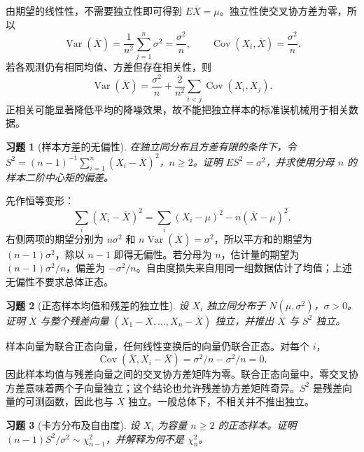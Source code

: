\documentclass[UTF8,12pt,a4paper,fontset=fandol]{ctexart}
\newtheorem{exercise}{习题}[section]
\begin{document}
\begin{solve}\label{a:B8.1}由期望的线性性，不需要独立性即可得到 $E\overline X=\mu$。独立性使交叉协方差为零，所以\[\operatorname{Var}(\overline X)=\frac{1}{n^2}\sum_{j=1}^n\sigma^2=\frac{\sigma^2}{n},\qquad\operatorname{Cov}(X_i,\overline X)=\frac{\sigma^2}{n}.\]若各观测仍有相同均值、方差但存在相关性，则\[\operatorname{Var}(\overline X)=\frac{\sigma^2}{n}+\frac{2}{n^2}\sum_{i<j}\operatorname{Cov}(X_i,X_j).\]正相关可能显著降低平均的降噪效果，故不能把独立样本的标准误机械用于相关数据。\end{solve}

\begin{exercise}[样本方差的无偏性]\label{q:B8.2}
在独立同分布且方差有限的条件下，令 $S^2=(n-1)^{-1}\sum_{i=1}^n(X_i-\overline X)^2$，$n\ge2$。证明 $ES^2=\sigma^2$，并求使用分母 $n$ 的样本二阶中心矩的偏差。\par{}
\end{exercise}

\begin{solve}\label{a:B8.2}先作恒等变形：\[\sum_i(X_i-\overline X)^2=\sum_i(X_i-\mu)^2-n(\overline X-\mu)^2.\]右侧两项的期望分别为 $n\sigma^2$ 和 $n\operatorname{Var}(\overline X)=\sigma^2$，所以平方和的期望为 $(n-1)\sigma^2$，除以 $n-1$ 即得无偏性。若分母为 $n$，估计量的期望为 $(n-1)\sigma^2/n$，偏差为 $-\sigma^2/n$。自由度损失来自用同一组数据估计了均值；上述无偏性不要求总体正态。\end{solve}

\begin{exercise}[正态样本均值和残差的独立性]\label{q:B8.3}
设 $X_i$ 独立同分布于 $N(\mu,\sigma^2)$，$\sigma>0$。证明 $\overline X$ 与整个残差向量 $(X_1-\overline X,\ldots,X_n-\overline X)$ 独立，并推出 $\overline X$ 与 $S^2$ 独立。\par{}
\end{exercise}

\begin{solve}\label{a:B8.3}样本向量为联合正态向量，任何线性变换后的向量仍联合正态。对每个 $i$，\[\operatorname{Cov}(\overline X,X_i-\overline X)=\sigma^2/n-\sigma^2/n=0.\]因此样本均值与残差向量之间的交叉协方差矩阵为零。联合正态向量中，零交叉协方差意味着两个子向量独立；这个结论也允许残差协方差矩阵奇异。$S^2$ 是残差向量的可测函数，因此也与 $\overline X$ 独立。一般总体下，不相关并不推出独立。\end{solve}

\begin{exercise}[卡方分布及自由度]\label{q:B8.4}
设 $X_i$ 为容量 $n\ge2$ 的正态样本。证明 $(n-1)S^2/\sigma^2\sim\chi^2_{n-1}$，并解释为何不是 $\chi^2_n$。\par{}
\end{exercise}
\end{document}
